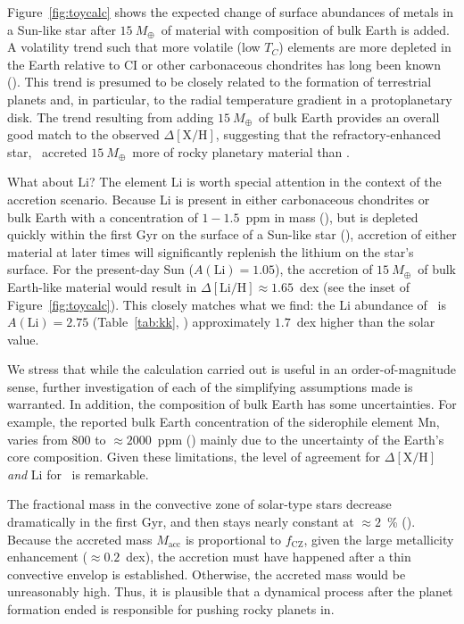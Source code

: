 \documentclass[modern, letterpaper]{aastex61}
\newcommand{\figname}{Figure}
\newcommand*\elem[1]{\ensuremath{\mathrm{#1}}}
\newcommand*\elemH[1]{\ensuremath{[\mathrm{#1}/\elem{H}]}}
\newcommand{\sunanalog}{\text{Krios}}
\newcommand{\bizarreone}{\text{Kronos}}
\newcommand{\Tcondens}{\ensuremath{T_C}}
\newcommand{\mearth}{\ensuremath{M_\oplus}}
\newcommand{\maccreted}{\ensuremath{15~\mearth}}
\begin{document}
Figure~\ref{fig:toycalc} shows the expected change of surface abundances of
metals in a Sun-like star after \maccreted\ of material with composition of
bulk Earth is added.
A volatility trend such that more volatile (low \Tcondens) elements are more
depleted in the Earth relative to CI or other carbonaceous chondrites
has long been known (\citealt{mcdonough2001composition}).
This trend is presumed to be closely related to the formation of terrestrial
planets and, in particular, to the radial temperature gradient in a
protoplanetary disk.
The trend resulting from adding \maccreted\ of bulk Earth
provides an overall good match to the observed $\Delta\elemH{X}$,
suggesting that the refractory-enhanced star, \bizarreone\,
accreted \maccreted\ more of rocky planetary material than \sunanalog.

What about \elem{Li}?
The element \elem{Li} is worth special attention in the context of the
accretion scenario.
Because Li is present in either carbonaceous chondrites or bulk Earth with a
concentration of $1-1.5$~ppm in mass (\citealt{2003TrGeo...2..547M}), but is
depleted quickly within the first Gyr on the surface of a Sun-like star
(\citealt{Thevenin2017,Baraffe2017}), accretion of either material at later
times will significantly replenish the lithium on the star's surface.
For the present-day Sun ($A(\elem{Li}) = 1.05$), the accretion of \maccreted\ of
bulk Earth-like material would result in $\Delta\elemH{Li} \approx 1.65$~dex
(see the inset of \figname~\ref{fig:toycalc}).
This closely matches what we find: the \elem{Li} abundance of \bizarreone\ is
$A(\elem{Li}) = 2.75$ (Table~\ref{tab:kk}, \citealt{jmlithium})
approximately $1.7$~dex higher than the solar value.

We stress that while the calculation carried out is useful in
an order-of-magnitude sense, further investigation of each of the simplifying
assumptions made is warranted.
In addition, the composition of bulk Earth has some uncertainties.
For example, the reported bulk Earth concentration of the siderophile element
\elem{Mn}, varies from $800$ to $\approx 2000$~ppm
(\citealt{1998psc..book.....L,mcdonough2001composition,2003TrGeo...2..547M})
mainly due to the uncertainty of the Earth's core composition.
Given these limitations, the level of agreement for $\Delta\elemH{X}$ {\it and}
\elem{Li} for \bizarreone\ is remarkable.

The fractional mass in the convective zone of solar-type stars
decrease dramatically in the first Gyr,
and then stays nearly constant at $\approx 2$~\% (\citealt{2013ApJ...776...87S}).
Because the accreted mass $M_\mathrm{acc}$ is proportional to $f_\mathrm{CZ}$,
given the large metallicity enhancement ($\approx 0.2$~dex),
the accretion must have happened after a thin convective envelop is established.
Otherwise, the accreted mass would be unreasonably high.
Thus, it is plausible that a dynamical process after the planet formation ended
is responsible for pushing rocky planets in.
\end{document}
